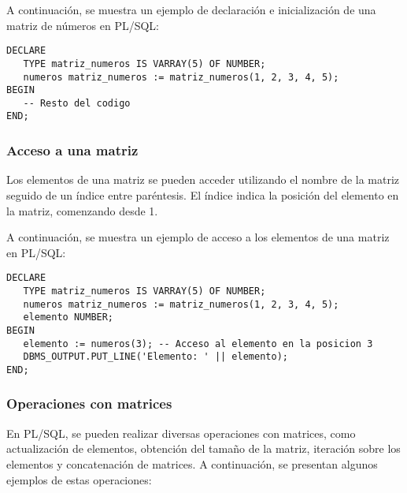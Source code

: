 \documentclass[executivepaper]{article}
\begin{document}
A continuación, se muestra un ejemplo de declaración e inicialización de una matriz de números en PL/SQL:

\begin{lstlisting}
DECLARE
   TYPE matriz_numeros IS VARRAY(5) OF NUMBER;
   numeros matriz_numeros := matriz_numeros(1, 2, 3, 4, 5);
BEGIN
   -- Resto del codigo
END;
\end{lstlisting}

\subsubsection*{Acceso a una matriz}

Los elementos de una matriz se pueden acceder utilizando el nombre de la matriz seguido de un índice entre paréntesis. El índice indica la posición del elemento en la matriz, comenzando desde 1.

A continuación, se muestra un ejemplo de acceso a los elementos de una matriz en PL/SQL:

\begin{lstlisting}
DECLARE
   TYPE matriz_numeros IS VARRAY(5) OF NUMBER;
   numeros matriz_numeros := matriz_numeros(1, 2, 3, 4, 5);
   elemento NUMBER;
BEGIN
   elemento := numeros(3); -- Acceso al elemento en la posicion 3
   DBMS_OUTPUT.PUT_LINE('Elemento: ' || elemento);
END;
\end{lstlisting}

\subsubsection*{Operaciones con matrices}

En PL/SQL, se pueden realizar diversas operaciones con matrices, como actualización de elementos, obtención del tamaño de la matriz, iteración sobre los elementos y concatenación de matrices. A continuación, se presentan algunos ejemplos de estas operaciones:
\end{document}
